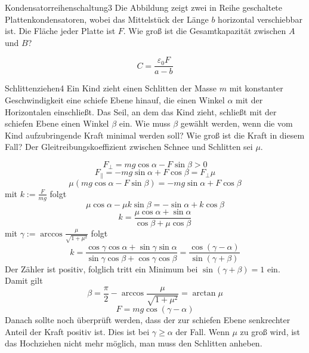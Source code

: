 


\begin{problem}{Kondensatorreihenschaltung}{3}
Die Abbildung zeigt zwei in Reihe geschaltete Plattenkondensatoren, wobei das Mittelstück der Länge $b$ horizontal verschiebbar ist. Die Fläche jeder Platte ist $F$. Wie groß ist die Gesamtkapazität zwischen $A$ und $B$?

\begin{solution}
\[
C=\frac{\varepsilon_0 F}{a-b}
\]
\end{solution}
\end{problem}

\begin{problem}{Schlittenziehen}{4}
Ein Kind zieht einen Schlitten der Masse $m$ mit konstanter Geschwindigkeit eine schiefe Ebene hinauf, die einen Winkel $\alpha$ mit der Horizontalen einschließt. Das Seil, an dem das Kind zieht, schließt mit der schiefen Ebene einen Winkel $\beta$ ein. Wie muss $\beta$ gewählt werden, wenn die vom Kind aufzubringende Kraft minimal werden soll? Wie groß ist die Kraft in diesem Fall? Der Gleitreibungskoeffizient zwischen Schnee und Schlitten sei $\mu$.
\begin{solution}
\[
F_{\perp}=mg \cos\alpha - F \sin\beta>0
\]
\[
F_{\parallel}=-mg \sin\alpha +F \cos\beta =F_{\perp} \mu
\]
\[
\mu\left(mg \cos\alpha-F \sin\beta \right)=-mg \sin\alpha+F \cos\beta
\]
mit $k:=\frac{F}{mg}$ folgt
\[
\mu \cos\alpha - \mu k \sin\beta=-\sin\alpha+k \cos\beta
\]
\[
k=\frac{\mu \cos\alpha+\sin\alpha}{\cos\beta + \mu\cos\beta} 
\]
mit $\gamma:=\arccos\frac{\mu}{\sqrt{1+\mu^2}}$ folgt
\[
k=\frac{\cos\gamma\cos\alpha+\sin\gamma\sin\alpha}{\sin\gamma\cos\beta + \cos\gamma\cos\beta}=\frac{\cos(\gamma-\alpha)}{\sin(\gamma+\beta)}
\]
Der Zähler ist positiv, folglich tritt ein Minimum bei $\sin(\gamma+\beta)=1$ ein. Damit gilt
\[
\beta=\frac\pi 2-\arccos\frac{\mu}{\sqrt{1+\mu^2}}=\arctan\mu
\]
\[
F=mg \cos(\gamma-\alpha)
\]
Danach sollte noch überprüft werden, dass der zur schiefen Ebene senkrechter Anteil der Kraft positiv ist. Dies ist bei $\gamma \geq \alpha$ der Fall. Wenn $\mu$ zu groß wird, ist das Hochziehen nicht mehr möglich, man muss den Schlitten anheben.
\end{solution}
\end{problem}

